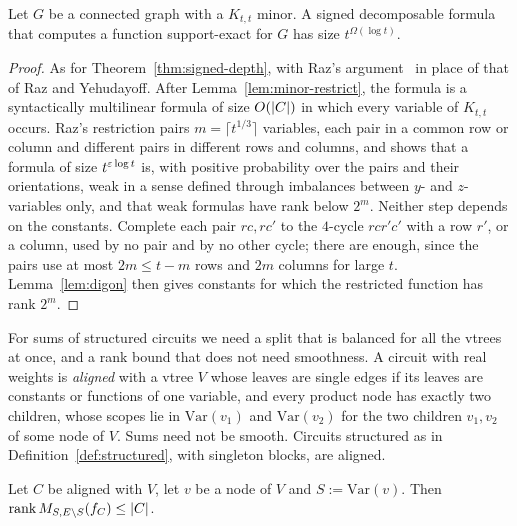 \begin{theorem}[formulas]\label{thm:signed-formula}
Let $G$ be a connected graph with a $K_{t,t}$ minor. A signed decomposable formula that computes a function support-exact for $G$ has size $t^{\Omega(\log t)}$.
\end{theorem}

\begin{proof}
As for Theorem~\ref{thm:signed-depth}, with Raz's argument~\cite{Raz09} in place of that of Raz and Yehudayoff. After Lemma~\ref{lem:minor-restrict}, the formula is a syntactically multilinear formula of size $O(\lvert C\rvert)$ in which every variable of $K_{t,t}$ occurs. Raz's restriction pairs $m=\lceil t^{1/3}\rceil$ variables, each pair in a common row or column and different pairs in different rows and columns, and shows that a formula of size $t^{\varepsilon\log t}$ is, with positive probability over the pairs and their orientations, weak in a sense defined through imbalances between $y$- and $z$-variables only, and that weak formulas have rank below $2^m$. Neither step depends on the constants. Complete each pair $rc,rc'$ to the $4$-cycle $rcr'c'$ with a row $r'$, or a column, used by no pair and by no other cycle; there are enough, since the pairs use at most $2m\le t-m$ rows and $2m$ columns for large $t$. Lemma~\ref{lem:digon} then gives constants for which the restricted function has rank $2^m$.
\end{proof}

For sums of structured circuits we need a split that is balanced for all the vtrees at once, and a rank bound that does not need smoothness. A circuit with real weights is \emph{aligned} with a vtree $V$ whose leaves are single edges if its leaves are constants or functions of one variable, and every product node has exactly two children, whose scopes lie in $\mathrm{Var}(v_1)$ and $\mathrm{Var}(v_2)$ for the two children $v_1,v_2$ of some node of $V$. Sums need not be smooth. Circuits structured as in Definition~\ref{def:structured}, with singleton blocks, are aligned.

\begin{lemma}\label{lem:frontier}
Let $C$ be aligned with $V$, let $v$ be a node of $V$ and $S:=\mathrm{Var}(v)$. Then $\operatorname{rank}M_{S,E\setminus S}(f_C)\le\lvert C\rvert$.
\end{lemma}

